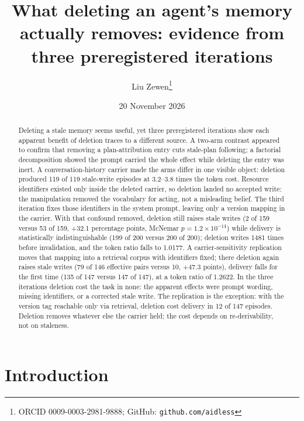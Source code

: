 \documentclass[11pt]{article}
\title{What deleting an agent's memory actually removes: evidence from three preregistered iterations}
\author{Liu Zewen\thanks{ORCID 0009-0003-2981-9888; GitHub: \texttt{github.com/aidless}}}
\date{20 November 2026}
\begin{document}
\begin{sloppypar}
\maketitle

\begin{abstract}
Deleting a stale memory seems useful, yet three preregistered iterations show each apparent benefit of deletion traces to a different source. A two-arm contrast appeared to confirm that removing a plan-attribution entry cuts stale-plan following; a factorial decomposition showed the prompt carried the whole effect while deleting the entry was inert. A conversation-history carrier made the arms differ in one visible object: deletion produced 119 of 119 stale-write episodes at 3.2--3.8 times the token cost. Resource identifiers existed only inside the deleted carrier, so deletion landed no accepted write: the manipulation removed the vocabulary for acting, not a misleading belief. The third iteration fixes those identifiers in the system prompt, leaving only a version mapping in the carrier. With that confound removed, deletion still raises stale writes (2 of 159 versus 53 of 159, +32.1 percentage points, McNemar $p=1.2\times10^{-14}$) while delivery is statistically indistinguishable (199 of 200 versus 200 of 200); deletion writes 1481 times before invalidation, and the token ratio falls to 1.0177. A carrier-sensitivity replication moves that mapping into a retrieval corpus with identifiers fixed; there deletion again raises stale writes (79 of 146 effective pairs versus 10, +47.3 points), delivery falls for the first time (135 of 147 versus 147 of 147), at a token ratio of 1.2622. In the three iterations deletion cost the task in none: the apparent effects were prompt wording, missing identifiers, or a corrected stale write. The replication is the exception: with the version tag reachable only via retrieval, deletion cost delivery in 12 of 147 episodes. Deletion removes whatever else the carrier held; the cost depends on re-derivability, not on staleness.
\end{abstract}

\section{Introduction}


\end{sloppypar}
\end{document}
